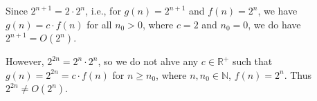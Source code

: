 
Since $2^{n + 1} = 2 \cdot 2^n$, i.e., for $g(n) = 2^{n+1}$ and $f(n) = 2^n$, we
have $g(n) = c \cdot f(n)$ for all $n_0 > 0$, where $c = 2$ and $n_0 = 0$, we do
have $2^{n + 1} = O(2^n)$.

However, $2^{2n} = 2^n \cdot 2^n$, so we do not ahve any $c \in \mathbb{R}^+$
such that $g(n) = 2^{2n} = c \cdot f(n)$ for $n \geq n_0$, where 
$n, n_0 \in \mathbb{N}$, $f(n) = 2^n$. Thus $2^{2n} \neq O(2^n)$.
